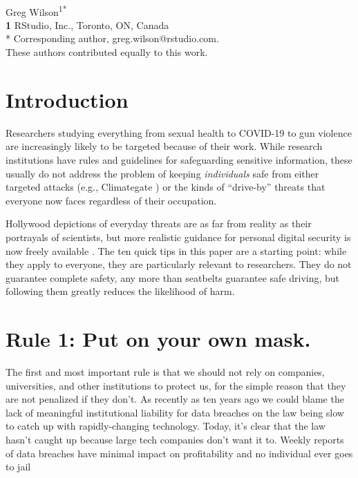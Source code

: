 \documentclass[10pt,letterpaper]{article}
\begin{document}
\vspace*{0.2in}

\begin{flushleft}
{\Large
\textbf{}
}
\newline
\\
{Greg Wilson}\textsuperscript{1{\ddag}*}
\\
\bigskip
\textbf{1} RStudio, Inc., Toronto, ON, Canada\\
* Corresponding author, greg.wilson@rstudio.com. \\
\bigskip
{\ddag} These authors contributed equally to this work.
\end{flushleft}

\section*{Introduction}

Researchers studying everything from sexual health to COVID-19 to gun violence
are increasingly likely to be targeted because of their work.
While research institutions have rules and guidelines for safeguarding sensitive information,
these usually do not address the problem of keeping \emph{individuals} safe
from either targeted attacks (e.g., Climategate \cite{Natu2010})
or the kinds of ``drive-by'' threats that everyone now faces regardless of their occupation.

Hollywood depictions of everyday threats are as far from reality as their portrayals of scientists,
but more realistic guidance for personal digital security is now freely available \cite{FLD,EFJ2015,EFF}.
The ten quick tips in this paper are a starting point:
while they apply to everyone,
they are particularly relevant to researchers.
They do not guarantee complete safety,
any more than seatbelts guarantee safe driving,
but following them greatly reduces the likelihood of harm.

\section*{Rule 1: Put on your own mask.}

The first and most important rule is that
we should not rely on companies, universities, and other institutions to protect us,
for the simple reason that they are not penalized if they don't.
As recently as ten years ago we could blame the lack of meaningful institutional liability for data breaches
on the law being slow to catch up with rapidly-changing technology.
Today,
it's clear that the law hasn't caught up because large tech companies don't want it to.
Weekly reports of data breaches have minimal impact on profitability and no individual ever goes to jail
\end{document}
